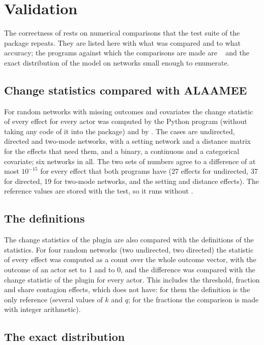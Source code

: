 \chapter{Validation}\label{ch:validation}

The correctness of \nwalaam{} rests on numerical comparisons that the test suite of the package repeats. They are listed here with what was compared and to what accuracy; the programs against which the comparisons are made are \alaamee{}~\cite{stivala2024} and the exact distribution of the model on networks small enough to enumerate.

\section{Change statistics compared with ALAAMEE}

For random networks with missing outcomes and covariates the change statistic of every effect for every actor was computed by the Python program \alaamee{} (without taking any code of it into the package) and by \nwalaam{}. The cases are undirected, directed and two-mode networks, with a setting network and a distance matrix for the effects that need them, and a binary, a continuous and a categorical covariate; six networks in all. The two sets of numbers agree to a difference of at most $10^{-15}$ for every effect that both programs have (27 effects for undirected, 37 for directed, 19 for two-mode networks, and the setting and distance effects). The reference values are stored with the test, so it runs without \alaamee{}.

\section{The definitions}

The change statistics of the plugin are also compared with the definitions of the statistics. For four random networks (two undirected, two directed) the statistic of every effect was computed as a count over the whole outcome vector, with the outcome of an actor set to 1 and to 0, and the difference was compared with the change statistic of the plugin for every actor. This includes the threshold, fraction and share contagion effects, which \alaamee{} does not have: for them the definition is the only reference (several values of $k$ and $q$; for the fractions the comparison is made with integer arithmetic).

\section{The exact distribution}

